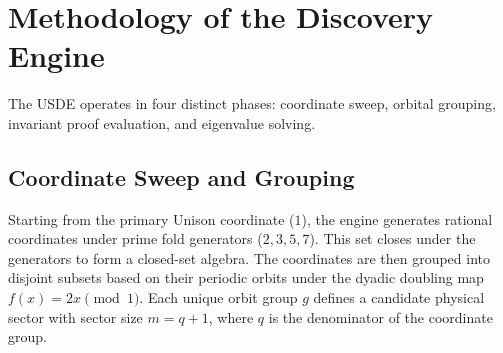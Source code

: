 \documentclass[11pt,a4paper]{article}
\begin{document}
\section{Methodology of the Discovery Engine}
The USDE operates in four distinct phases: coordinate sweep, orbital grouping, invariant proof evaluation, and eigenvalue solving.

\subsection{Coordinate Sweep and Grouping}
Starting from the primary Unison coordinate ($1$), the engine generates rational coordinates under prime fold generators ($2, 3, 5, 7$). This set closes under the generators to form a closed-set algebra. The coordinates are then grouped into disjoint subsets based on their periodic orbits under the dyadic doubling map $f(x) = 2x \pmod 1$. Each unique orbit group $g$ defines a candidate physical sector with sector size $m = q + 1$, where $q$ is the denominator of the coordinate group.
\end{document}

